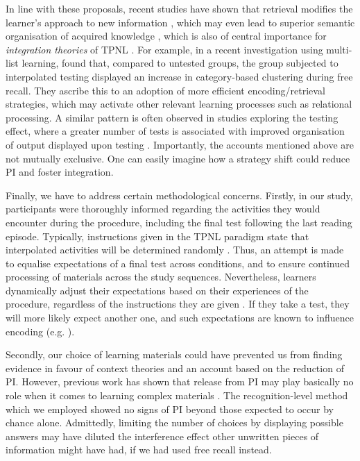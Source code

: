 \documentclass[../main.tex]{subfiles}
\begin{document}
In line with these proposals, recent studies have shown that retrieval 
modifies the learner's approach to new information 
\citep{choTestingEnhancesBoth2017, 
soderstromTestingFacilitatesRegulation2014}, which may even lead to
superior semantic organisation of acquired knowledge 
\citep{chanTestingPotentiatesNew2018, 
	jingInterpolatedTestingInfluences2016}, which is also of central
importance for \textit{integration theories} of TPNL 
\citep{chanRetrievalPotentiatesNew2018}. For example, in a 
recent investigation using multi-list learning, 
\cite{chanTestingPotentiatesNew2018} found that, compared to untested 
groups, the group subjected to interpolated testing displayed an increase in 
category-based clustering during free recall. They ascribe this to an 
adoption of more efficient encoding/retrieval strategies, which may activate 
other relevant learning processes such as relational processing. A similar 
pattern is often observed in studies exploring the testing effect, where a 
greater number of tests is associated with improved organisation of output 
displayed upon testing \citep{zarombTestingEffectFree2010, 
	karpickeRetrievalBasedLearningActive2012}. Importantly, 
	the accounts mentioned above are not mutually 
	exclusive. One can easily imagine how a strategy shift 
	could reduce PI and foster integration.

Finally, we have to address certain methodological 
concerns.  Firstly, in our study, participants were 
thoroughly informed regarding the activities they would 
encounter during the procedure, including the final test 
following the last reading episode. Typically, instructions 
given in the TPNL paradigm state that interpolated 
activities will be determined randomly
\citep{yangEnhancingLearningRetrieval2018}. Thus, an 
attempt is made to equalise expectations of a final test 
across conditions, and to ensure continued processing of 
materials across the study sequences. Nevertheless, 
learners dynamically adjust their expectations based on 
their experiences of the procedure, regardless of the 
instructions they are given 
\citep{weinsteinRoleTestExpectancy2014}. If they take a 
test, they will more likely expect another one, and such 
expectations are known to influence encoding (e.g. 
\citealp{szpunarExpectationFinalCumulative2007}).

Secondly, our choice of learning materials could have 
prevented us from finding evidence in favour of context 
theories and an account based on the reduction of PI. 
However, previous work has shown that release from PI may 
play basically no role when it comes to learning complex 
materials \citep{divisRetrievalSpeedsContext2014, 
wissmanInterimTestEffect2011}. The recognition-level method 
which we employed showed no signs of PI beyond those 
expected to occur by chance alone. Admittedly, limiting the 
number of choices by displaying possible answers may have 
diluted the interference effect other unwritten pieces of 
information might have had, if we had used free recall instead.
\end{document}
